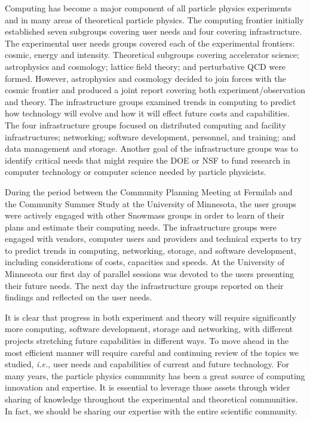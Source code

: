 
Computing has become a major component of all particle physics experiments and in many areas of theoretical particle physics. The computing frontier initially established seven subgroups covering user needs and four covering infrastructure. The experimental user needs groups covered each of the experimental frontiers: cosmic, energy and intensity. Theoretical subgroups covering accelerator science; astrophysics and cosmology; lattice field theory; and perturbative QCD were formed.  However, astrophysics and cosmology decided to join forces with the cosmic frontier and produced a joint report covering both experiment/observation and theory. The infrastructure groups examined trends in computing to predict how technology will evolve and how it will effect future costs and capabilities. The four infrastructure groups focused on distributed computing and facility infrastructures; networking; software development, personnel,  and training; and data management and storage. Another goal of the infrastructure groups was to identify critical needs that might require the DOE or NSF to fund research in computer technology or computer science needed by particle physicists.

During the period between the Community Planning Meeting at Fermilab and the Community Summer Study at the University of Minnesota, the user groups were actively engaged with other Snowmass groups in order to learn of their plans and estimate their computing needs.  The infrastructure groups were engaged with vendors, computer users and providers and technical experts to try to predict trends in computing, networking, storage, and software development, including considerations of costs, capacities and speeds.  At the University of Minnesota our first day of parallel sessions was devoted to the users presenting their future needs.  The next day the infrastructure groups reported on their findings and reflected on the user needs.

It is clear that progress in both experiment and theory will require significantly more computing, software development, storage and networking, with different projects stretching future capabilities in different ways. To move ahead in the most efficient manner will require careful and continuing review of the topics we studied, {\it i.e.}, user needs and capabilities of current and future technology. For many years, the particle physics community has been a great source of computing innovation and expertise.  It is essential to leverage those assets through wider sharing of knowledge throughout the experimental and theoretical communities.  In fact, we should be sharing our expertise with the entire scientific community.

